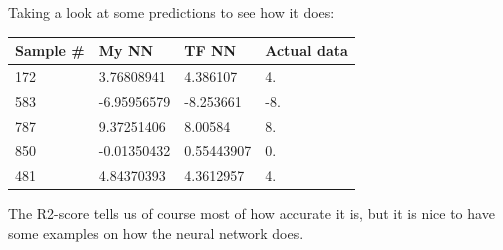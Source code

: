 \documentclass[a4paper,norsk]{article}
\begin{document}
Taking a look at some predictions to see how it does:\\
\begin{center}
    \begin{tabular}{| l | l | l | l |}
    \hline
    Sample \# & My NN & TF NN & Actual data \\ \hline
    172 & 3.76808941 & 4.386107 & 4. \\ \hline
    583 & -6.95956579 & -8.253661 &-8. \\ \hline
    787 & 9.37251406 & 8.00584 &8. \\ \hline
    850 & -0.01350432 & 0.55443907 &0. \\ \hline
    481 & 4.84370393 & 4.3612957 &4. \\
    \hline
    \end{tabular}
\end{center}
The R2-score tells us of course most of how accurate it is, but it is nice to have some examples on how the neural network does.\\

\clearpage
\end{document}
